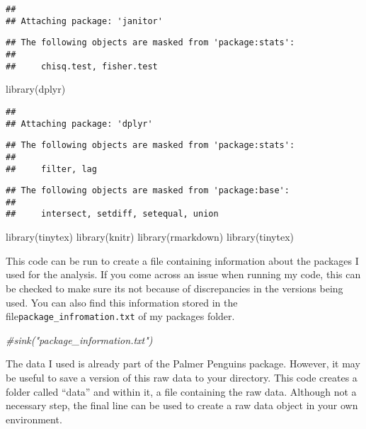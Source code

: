 \documentclass[
]{article}
\newenvironment{Shaded}{\begin{snugshade}}{\end{snugshade}}
\newcommand{\CommentTok}[1]{\textcolor[rgb]{0.56,0.35,0.01}{\textit{#1}}}
\newcommand{\FunctionTok}[1]{\textcolor[rgb]{0.00,0.00,0.00}{#1}}
\newcommand{\NormalTok}[1]{#1}
\begin{document}
\begin{verbatim}
## 
## Attaching package: 'janitor'
\end{verbatim}

\begin{verbatim}
## The following objects are masked from 'package:stats':
## 
##     chisq.test, fisher.test
\end{verbatim}

\begin{Shaded}
\begin{Highlighting}[]
\FunctionTok{library}\NormalTok{(dplyr)}
\end{Highlighting}
\end{Shaded}

\begin{verbatim}
## 
## Attaching package: 'dplyr'
\end{verbatim}

\begin{verbatim}
## The following objects are masked from 'package:stats':
## 
##     filter, lag
\end{verbatim}

\begin{verbatim}
## The following objects are masked from 'package:base':
## 
##     intersect, setdiff, setequal, union
\end{verbatim}

\begin{Shaded}
\begin{Highlighting}[]
\FunctionTok{library}\NormalTok{(tinytex)}
\FunctionTok{library}\NormalTok{(knitr)}
\FunctionTok{library}\NormalTok{(rmarkdown)}
\FunctionTok{library}\NormalTok{(tinytex)}
\end{Highlighting}
\end{Shaded}

This code can be run to create a file containing information about the
packages I used for the analysis. If you come across an issue when
running my code, this can be checked to make sure its not because of
discrepancies in the versions being used. You can also find this
information stored in the file\texttt{package\_infromation.txt} of my
packages folder.

\begin{Shaded}
\begin{Highlighting}[]
\CommentTok{\#sink("package\_information.txt")}
\end{Highlighting}
\end{Shaded}

The data I used is already part of the Palmer Penguins package. However,
it may be useful to save a version of this raw data to your directory.
This code creates a folder called ``data'' and within it, a file
containing the raw data. Although not a necessary step, the final line
can be used to create a raw data object in your own environment.
\end{document}

